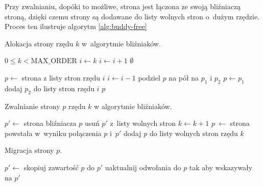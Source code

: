 Przy zwalnianiu, dopóki to możliwe, strona jest łączona ze swoją
bliźniaczą stroną, dzięki czemu strony są dodawane do listy wolnych
stron o~dużym rzędzie.  Proces ten ilustruje algorytm
\ref{alg:buddy-free}

\begin{algorithm}[p]
\caption[Alokacja strony w~algorytmie bliźniaków.]{Alokacja strony
  rzędu $k$ w~algorytmie bliźniaków.}
\label{alg:buddy-alloc}
\begin{algorithmic}[1]
\Require $0 \leq k < \mathrm{MAX\_ORDER}$
    \State $i \gets k$
        \State $i \gets i + 1$
            \State \Return $\emptyset$
        \EndIf
    \EndWhile

    \State $p \gets$ strona z listy stron rzędu $i$
        \State $i \gets i - 1$
        \State podziel $p$ na pół na $p_1$ i $p_2$
        \State $p \gets p_1$
        \State dodaj $p_2$ do listy stron rzędu $i$
    \EndWhile
    \State \Return $p$
\EndFunction
\end{algorithmic}
\end{algorithm}

\begin{algorithm}[p]
\caption[Zwalnianie strony w~algorytmie bliźniaków.]{Zwalnianie strony
  $p$ rzędu $k$ w algorytmie bliźniaków.}
\label{alg:buddy-free}
\begin{algorithmic}[1]
        \State $p' \gets$ strona bliźniacza $p$
        \State usuń $p'$ z~listy wolnych stron
        \State $k \gets k + 1$
        \State $p~\gets$ strona powstała w~wyniku połączenia $p$ i~$p'$ \label{alg:buddy-free:join}
    \EndWhile
    \State dodaj $p$ do listy wolnych stron rzędu $k$ \label{alg:buddy-free:add}
\EndProcedure
\end{algorithmic}
\end{algorithm}

\begin{algorithm}[p]
\caption[Migracja strony.]{Migracja strony $p$.}
\label{alg:migrate}
\begin{algorithmic}[1]
    \State $p' \gets$ 
    \State skopiuj zawartość $p$ do $p'$
    \State uaktualnij odwołania do $p$ tak aby wskazywały na $p'$
    \State {}
\EndProcedure
\end{algorithmic}
\end{algorithm}

